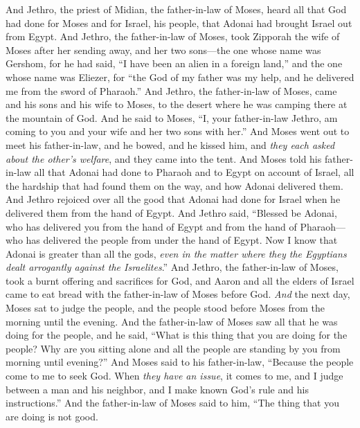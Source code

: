 \begin{biblechapter} %
 And Jethro, the priest of Midian, the father-in-law of Moses, heard all that God had done for Moses and for Israel, his people, that Adonai had brought Israel out from Egypt.
\verse And Jethro, the father-in-law of Moses, took Zipporah the wife of Moses after her sending away,
\verse and her two sons—the one whose name was Gershom, for he had said, “I have been an alien in a foreign land,”
\verse and the one whose name was Eliezer, for “the God of my father was my help, and he delivered me from the sword of Pharaoh.”
\verse And Jethro, the father-in-law of Moses, came and his sons and his wife to Moses, to the desert where he was camping there at the mountain of God.
\verse And he said to Moses, “I, your father-in-law Jethro, am coming to you and your wife and her two sons with her.”
\verse And Moses went out to meet his father-in-law, and he bowed, and he kissed him, and \textit{they each asked about the other’s welfare}, and they came into the tent.
\verse And Moses told his father-in-law all that Adonai had done to Pharaoh and to Egypt on account of Israel, all the hardship that had found them on the way, and how Adonai delivered them.
\verse And Jethro rejoiced over all the good that Adonai had done for Israel when he delivered them from the hand of Egypt.
\verse And Jethro said, “Blessed be Adonai, who has delivered you from the hand of Egypt and from the hand of Pharaoh—who has delivered the people from under the hand of Egypt.
\verse Now I know that Adonai is greater than all the gods, \textit{even in the matter where they the Egyptians dealt arrogantly against the Israelites}.”
\verse And Jethro, the father-in-law of Moses, took a burnt offering and sacrifices for God, and Aaron and all the elders of Israel came to eat bread with the father-in-law of Moses before God.
\verse \textit{And} the next day, Moses sat to judge the people, and the people stood before Moses from the morning until the evening.
\verse And the father-in-law of Moses saw all that he was doing for the people, and he said, “What is this thing that you are doing for the people? Why are you sitting alone and all the people are standing by you from morning until evening?”
\verse And Moses said to his father-in-law, “Because the people come to me to seek God.
\verse When \textit{they have an issue}, it comes to me, and I judge between a man and his neighbor, and I make known God’s rule and his instructions.”
\verse And the father-in-law of Moses said to him, “The thing that you are doing is not good.

\end{biblechapter}
